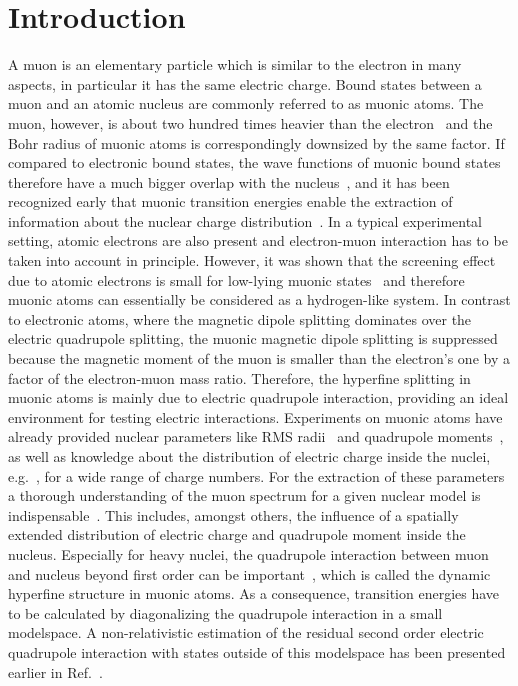 \section{Introduction}
A muon is an elementary particle which is similar to the electron in many aspects, in particular it has the same electric charge. Bound states between a muon and an atomic nucleus are commonly referred to as muonic atoms. The muon, however, is about two hundred times heavier than the electron~\cite{codata2016} and the Bohr radius of muonic atoms is correspondingly downsized by the same factor. If compared to electronic bound states, the wave functions of muonic bound states therefore have a much bigger overlap with the nucleus~\cite{Patoary2018}, and it has been recognized early that muonic transition energies enable the extraction of information about the nuclear charge distribution~\cite{wheeler1953}. In a typical experimental setting, atomic electrons are also present and electron-muon interaction has to be taken into account in principle. However, it was shown that the screening effect due to atomic electrons is small for low-lying muonic states~\cite{michel2017,vogel1973,fricke1969} and therefore muonic atoms can essentially be considered as a hydrogen-like system. In contrast to electronic atoms, where the magnetic dipole splitting dominates over the electric quadrupole splitting, the muonic magnetic dipole splitting is suppressed because the magnetic moment of the muon is smaller than the electron's one by a factor of the electron-muon mass ratio. Therefore, the hyperfine splitting in muonic atoms is mainly due to electric quadrupole interaction, providing an ideal environment for testing electric interactions. Experiments on muonic atoms have already provided nuclear parameters like RMS radii~\cite{fricke1995} and quadrupole moments~\cite{stone2016,tanaka1983}, as well as knowledge about the distribution of electric charge inside the nuclei, e.g.~\cite{tanaka1984_2,tanaka1984}, for a wide range of charge numbers. For the extraction of these parameters a thorough understanding of the muon spectrum for a given nuclear model is indispensable~\cite{BorieRinker1982}. This includes, amongst others, the influence of a spatially extended distribution of electric charge and quadrupole moment inside the nucleus. Especially for heavy nuclei, the quadrupole interaction between muon and nucleus beyond first order can be important~\cite{tanaka1984,hitlin1970,wu1969,Devons1995}, which is called the dynamic hyperfine structure in muonic atoms. As a consequence, transition energies have to be calculated by diagonalizing the quadrupole interaction in a small modelspace. A non-relativistic estimation of the residual second order electric quadrupole interaction with states outside of this modelspace has been presented earlier in Ref.~\cite{chen1970}.

